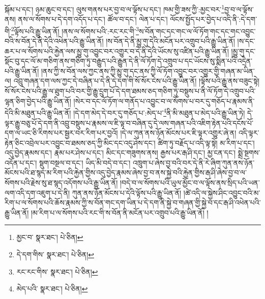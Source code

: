 སྐོམ་པ་དང་། ཉམ་ཆུང་བ་དང་། ལུས་གནས་པར་བྱ་བ་ལ་ལྟོས་པ་དང་། ཁམ་གྱི་ཟས་ཀྱི་:མྱང་བར་\footnote{མྱང་བ་  སྣར་ཐང་།  པེ་ཅིན། }བྱ་བ་ལ་ལྟོས་ནས། ནས་ལ་སོགས་པ་དེ་དག་འདོད་པ་དང་། ཚོལ་བ་དང་། ལེན་པ་དང་། ལོངས་སྤྱོད་པར་བྱེད་པ་འདི་ནི་:དེ་དག་གི་\footnote{དེ་དག་གིས་  སྣར་ཐང་།  པེ་ཅིན། }ལྟོས་པའི་རྒྱུ་ཡིན་ནོ། །ནས་ལ་སོགས་པའི་:རང་རང་གི་\footnote{རང་རང་གིས་  སྣར་ཐང་།  པེ་ཅིན། }ས་བོན་གང་དང་གང་ལ་ལོ་ཏོག་གང་དང་གང་འབྱུང་བའི་ས་བོན་དེ་ནི་དེའི་འཕེན་པའི་རྒྱུ་ཡིན་ནོ། །ས་བོན་དེ་ནི་མྱུ་གུ་དེའི་མངོན་པར་འགྲུབ་པའི་རྒྱུ་ཡིན་ནོ། །ས་དང་ཆར་པ་ལ་སོགས་པའི་རྐྱེན་ལས་མྱུ་གུ་འབྱུང་བར་འགྱུར་བ་དེ་ནི་དེའི་ཡོངས་སུ་འཛིན་པའི་རྒྱུ་ཡིན་ནོ། །མྱུ་གུ་དང་སྡོང་བུ་དང་ལོ་མ་གཅིག་ནས་གཅིག་ཏུ་བརྒྱུད་པའི་རྒྱུན་དེ་ནི་ལོ་ཏོག་དེ་འགྲུབ་པ་དང་ཡོངས་སུ་སྨིན་པའི་འདྲེན་པའི་རྒྱུ་ཡིན་ནོ། །ནས་ཀྱི་ས་བོན་ལས་ཀྱང་ནས་ཀྱི་མྱུ་གུ་དང་ནས་ཀྱི་ལོ་ཏོག་འབྱུང་བར་འགྱུར་གྱི་གཞན་མ་ཡིན་ལ། འབྲུ་གཞན་དག་ལས་ཀྱང་དེ་བཞིན་པ་དེ་ནི་དེ་དག་གི་སོ་སོར་ངེས་པའི་རྒྱུ་ཡིན་ནོ། །ལྟོས་པའི་རྒྱུ་ནས་བཟུང་སྟེ། སོ་སོར་ངེས་པའི་རྒྱུ་ལ་ཐུག་པའི་བར་གྱི་རྒྱུ་དྲུག་པོ་དེ་དག་ཐམས་ཅད་གཅིག་ཏུ་བསྡུས་པ་ནི་ལོ་ཏོག་དེ་འགྲུབ་པའི་ལྷན་ཅིག་བྱེད་པའི་རྒྱུ་ཡིན་ནོ། །སེར་བ་དང་ལོ་ཏོག་ལ་གནོད་པ་འབྱུང་བ་ལ་སོགས་པ་བར་དུ་གཅོད་པ་རྣམས་ནི་དེའི་མི་མཐུན་པའི་རྒྱུ་ཡིན་ནོ། །དེ་དག་མེད་དེ་བར་དུ་གཅོད་པ་:མེད་པ་\footnote{མེད་པའི་  སྣར་ཐང་།  པེ་ཅིན། }ནི་མི་མཐུན་པ་མེད་པའི་རྒྱུ་ཡིན་ཏེ། དེ་ལྟར་རྒྱུ་བཅུ་པོ་དེ་དག་ནི་འབྲུ་བསྡུས་པ་རྣམས་ལ་ཇི་ལྟ་བ་བཞིན་དུ་དེ་ལས་གཞན་པའི་འཇིག་རྟེན་པའི་དངོས་པོ་དག་ལ་ཡང་ཅི་རིགས་པར་སྦྱར་བར་རིག་པར་བྱའོ། །དེ་ལ་ཀུན་ནས་ཉོན་མོངས་པར་ཇི་ལྟར་འགྱུར་ཞེ་ན། འདི་ལྟར་རྟེན་ཅིང་འབྲེལ་པར་འབྱུང་བ་ཐམས་ཅད་ཀྱི་མིང་དང་འདུ་ཤེས་དང་། ཚིག་ཏུ་བརྗོད་པ་འདི་ལྟ་སྟེ། མ་རིག་པ་དང་། འདུ་བྱེད་རྣམས་དང་། རྣམ་པར་ཤེས་པ་དང་། མིང་དང་གཟུགས་ནས། རྒྱས་པར་རྒ་ཤི་དང་། མྱ་ངན་དང་། སྨྲེ་སྔགས་འདོན་པ་དང་། སྡུག་བསྔལ་བ་དང་། ཡིད་མི་བདེ་བ་དང་། འཁྲུག་པ་ཞེས་བྱ་བའི་བར་དེ་ནི་རེ་ཞིག་ཀུན་ནས་ཉོན་མོངས་པའི་ཐ་སྙད་མ་རིག་པའི་རྐྱེན་གྱིས་འདུ་བྱེད་རྣམས་ཞེས་བྱ་བ་ནས་སྐྱེ་བའི་རྐྱེན་གྱིས་རྒ་ཤི་ཞེས་བྱ་བ་ལ་སོགས་པའི་རྗེས་སུ་ཐ་སྙད་འདོགས་པའི་རྒྱུ་ཡིན་ནོ། །བདེ་བ་ལ་སོགས་པའི་ཡུལ་མྱོང་བ་ལ་ལྟོས་ནས་སྲིད་པའི་ཡན་ལག་འདི་དག་འཇུག་པ་དེ་ནི། ཀུན་ནས་ཉོན་མོངས་པ་དེའི་ལྟོས་པའི་རྒྱུ་ཡིན་ནོ། །ཚེ་འདི་ལ་སྐྱེས་ཤིང་འབྱུང་བའི་མ་རིག་པ་ལ་སོགས་པའི་ཆོས་རྣམས་ཀྱི་ས་བོན་གང་དག་ཡིན་པ་དེ་དག་ནི་སྐྱེ་བ་གཞན་གྱི་སྐྱེ་བ་དང་རྒ་ཤི་འཕེན་པའི་རྒྱུ་ཡིན་ནོ། །མ་རིག་པ་ལ་སོགས་པའི་རང་གི་ས་བོན་ནི་མངོན་པར་འགྲུབ་པའི་རྒྱུ་ཡིན་ནོ། །
